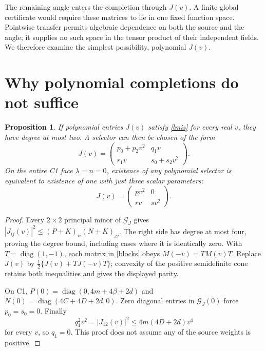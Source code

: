 \documentclass[11pt]{article}
\newtheorem{proposition}[theorem]{Proposition}
\begin{document}
The remaining angle enters the completion through $J(v)$. A finite global
certificate would require these matrices to lie in one fixed function space.
Pointwise transfer permits algebraic dependence on both the source and the
angle; it supplies no such space in the tensor product of their independent
fields. We therefore examine the simplest possibility, polynomial $J(v)$.

\section{Why polynomial completions do not suffice}
\begin{proposition}\label{prop:degree}
If polynomial entries $J(v)$ satisfy \eqref{lmis} for every real $v$, they have
degree at most two.  A selector can then be chosen of the form
\[
J(v)=\begin{pmatrix}p_0+p_2v^2&q_1v\\r_1v&s_0+s_2v^2\end{pmatrix}.
\]
On the entire C1 face $\lambda=n=0$, existence of any polynomial selector is
equivalent to existence of one with just three scalar parameters:
\begin{equation}
\boxed{J(v)=\begin{pmatrix}pv^2&0\\rv&sv^2\end{pmatrix}.}\label{three}
\end{equation}
\end{proposition}
\begin{proof}
Every $2\times2$ principal minor of $\mathcal G_J$ gives
$|J_{ij}(v)|^2\leq(P+K)_{ii}(N+K)_{jj}$.  The right side has degree at most
four, proving the degree bound, including cases where it is identically zero.
With $T=\operatorname{diag}(1,-1)$, each matrix in \eqref{blocks} obeys
$M(-v)=TM(v)T$.  Replace $J(v)$ by
$\tfrac12\{J(v)+TJ(-v)T\}$; convexity of the positive semidefinite cone retains
both inequalities and gives the displayed parity.

On C1, $P(0)=\operatorname{diag}(0,4m+4\beta+2d)$ and
$N(0)=\operatorname{diag}(4C+4D+2d,0)$.  Zero diagonal entries in
$\mathcal G_J(0)$ force $p_0=s_0=0$. Finally
\[
q_1^2v^2=|J_{12}(v)|^2\leq4m(4D+2d)v^4
\]
for every $v$, so $q_1=0$. This proof does not assume any of the source weights
is positive.
\end{proof}
\end{document}
